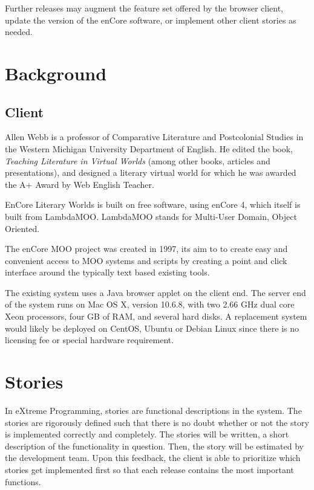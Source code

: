 \documentclass[12pt, letterpaper]{report}
\begin{document}
	

	\par
    Further releases may augment the feature set offered by the browser client, update the version of the enCore software, or implement other client stories as needed.
	\tableofcontents

	\chapter{Background}
	
	\section{Client}
	\par
	Allen Webb is a professor of Comparative Literature and Postcolonial Studies in the Western Michigan University Department of English. He edited the book, \textit{Teaching Literature in Virtual Worlds} (among other books, articles and presentations), and designed a literary virtual world for which he was awarded the A+ Award by Web English Teacher.
    	
	\par
	EnCore Literary Worlds is built on free software, using enCore 4, which itself is built from LambdaMOO. LambdaMOO stands for Multi-User Domain, Object Oriented.
	
		\par 
	The enCore MOO project was created in 1997, its aim to to create easy and convenient access to MOO systems and scripts by creating a point and click interface around the typically text based existing tools.

	\par
	The existing system uses a Java browser applet on the client end. The server end of the system runs on Mac OS X, version 10.6.8, with two 2.66 GHz dual core Xeon processors, four GB of RAM, and several hard disks. A replacement system would likely be deployed on CentOS, Ubuntu or Debian Linux since there is no licensing fee or special hardware requirement.

	\par 
	
	
	
	\chapter{Stories}
	\par
	In eXtreme Programming, stories are functional descriptions in the system. The stories are rigorously defined such that there is no doubt whether or not the story is implemented correctly and completely. The stories will be written, a short description of the functionality in question. Then, the story will be estimated by the development team. Upon this feedback, the client is able to prioritize which stories get implemented first so that each release contains the most important functions.
	
\end{document}
